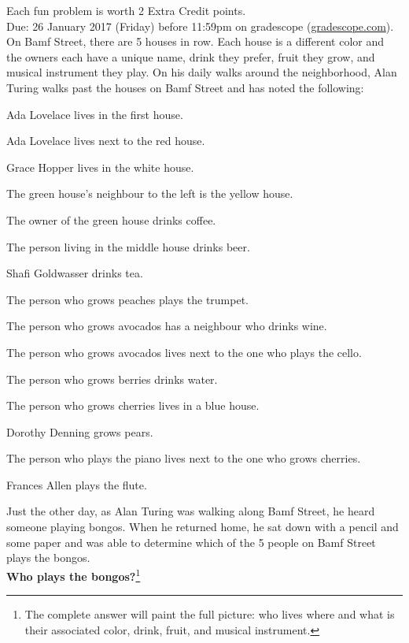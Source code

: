 \documentclass{article}
\theoremstyle{definition}
\begin{document}
\noindent
Each fun problem is worth 2 Extra Credit points.\\
Due: 26 January 2017 (Friday) before 11:59pm on gradescope (\url{gradescope.com}).\\

\noindent
On Bamf Street, there are 5 houses in row.  Each house is a different color and the owners each have a unique name, drink they prefer, fruit they grow, and musical instrument they play.  On his daily walks around the neighborhood, Alan Turing walks past the houses on Bamf Street and has noted the following:
\begin{compactitem}
\item Ada Lovelace lives in the first house.
\item Ada Lovelace lives next to the red house.
\item Grace Hopper lives in the white house.
\item The green house's neighbour to the left is the yellow house.
\item The owner of the green house drinks coffee.
\item The person living in the middle house drinks beer.
\item Shafi Goldwasser drinks tea.
\item The person who grows peaches plays the trumpet.
\item The person who grows avocados has a neighbour who drinks wine.
\item The person who grows avocados lives next to the one who plays the cello.
\item The person who grows berries drinks water.
\item The person who grows cherries lives in a blue house.
\item Dorothy Denning grows pears.
\item The person who plays the piano lives next to the one who grows cherries.
\item Frances Allen plays the flute.
\end{compactitem}
Just the other day, as Alan Turing was walking along Bamf Street, he heard someone playing bongos.  When he returned home, he sat down with a pencil and some paper and was able to determine which of the 5 people on Bamf Street plays the bongos.\\
\textbf{Who plays the bongos?}\footnote{The complete answer will paint the full picture: who lives where and what is their associated color, drink, fruit, and musical instrument.}
\end{document}
